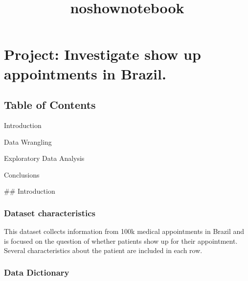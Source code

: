 \documentclass[11pt]{article}
\title{noshownotebook}
\begin{document}
    
    
    \maketitle
    
    

    
    \section{Project: Investigate show up appointments in
Brazil.}\label{project-investigate-show-up-appointments-in-brazil.}

\subsection{Table of Contents}\label{table-of-contents}

Introduction

Data Wrangling

Exploratory Data Analysis

Conclusions

     \#\# Introduction

\subsubsection{Dataset characteristics}\label{dataset-characteristics}

This dataset collects information from 100k medical appointments in
Brazil and is focused on the question of whether patients show up for
their appointment. Several characteristics about the patient are
included in each row.

\subsubsection{Data Dictionary}\label{data-dictionary}
\end{document}
